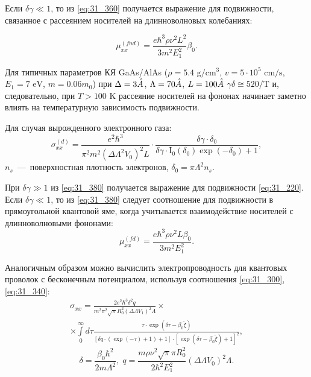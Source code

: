 Если $\delta \gamma \ll 1$, то из \eqref{eq:31_360} получается выражение для подвижности, связанное с рассеянием носителей на длинноволновых колебаниях:

\begin{equation} \label{eq:31_370}
\mu _{xx}^{(fnd)} =\frac{e\hbar ^{3} \rho \nu ^{2} L^{2} }{3m^{2} E_{1}^{2} } \beta _{0}. 
\end{equation}

Для типичных параметров КЯ GaAs/AlAs ($\rho =5.4 \text{ g} / \text{cm}^3 $, $v=5\cdot 10^5 \text{ cm/s}$, $E_1 =7 \text{ eV}$, $m=0.06m_{0} $) при $\Delta =3 \AA$, $\Lambda =70 \AA$, $L = 100 \AA$  $\gamma \delta \cong 520/\text{T}$ и, следовательно, при $T>100\text{ K}$ рассеяние носителей на фононах начинает заметно влиять на температурную зависимость подвижности.

Для случая вырожденного электронного газа:
\begin{equation} \label{eq:31_380}
\sigma _{xx}^{(d)} =\frac{e^2 \hbar^3 }{\pi^2 m^2 \left(\Delta \Lambda^2 V_0 \right)^2 L} \cdot 
\frac{\delta \gamma \cdot \delta_0 }{\delta \gamma \cdot \mathrm{I}_0 \left(\delta_0 \right)\exp\left(-\delta_0 \right)+1} ,
\end{equation}
$n_s $~---~поверхностная плотность электронов, $\delta_0 =\pi \Lambda^2 n_s $.

При $\delta \gamma \gg 1$ из \eqref{eq:31_380} получается выражение для подвижности \eqref{eq:31_220}. Если $\delta \gamma \ll 1$, то из \eqref{eq:31_380} следует соотношение для подвижности в прямоугольной квантовой яме, когда учитывается взаимодействие носителей с длинноволновыми фононами:
\begin{equation} \label{eq:31_390}
\mu _{xx}^{(fd)} =\frac{e\hbar^3 \rho \nu^2 L\beta_0 }{3 m^2 E_1^2 }. 
\end{equation}
 
Аналогичным образом можно вычислить электропроводность для квантовых проволок с бесконечным потенциалом, используя соотношения \eqref{eq:31_300}, \eqref{eq:31_340}:
\begin{multline} \label{eq:31_400}
\sigma _{xx} =\frac{2e^2 \hbar^3 \delta^2 q}{m^2 \pi^2 \sqrt{\pi } R_0^2 \left(\Delta \Lambda V_1 \right)^2 \Lambda } \times\\
\times\int\limits_0^{\infty} {d\tau \frac{\tau \cdot {\exp}\left(\delta \tau -\beta _{0} \tilde{\xi }\right)}{\left[\delta q\cdot \left(\exp(-\tau) +1 \right)+1\right]\cdot \left[{\exp}\left(\delta \tau -\beta _{0} \tilde{\xi }\right)+1\right]^{2} }}, 
\end{multline}
\[
\delta =\frac{\beta_0 \hbar^2 }{2m\Lambda^2 }, \;
q=\frac{m \rho \nu^2 \sqrt{\pi } \pi R_0^2 }{2\hbar^2 E_1^2 } \left(\Delta \Lambda V_0 \right)^2 \Lambda .
\] 

